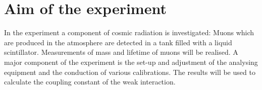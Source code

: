 \section{Aim of the experiment}

In the experiment a component of cosmic radiation is investigated:
Muons which are produced in the atmosphere are detected in a tank filled with a liquid scintillator.
Measurements of mass and lifetime of muons will be realised.
A major component of the experiment is the set-up and adjustment of the analysing equipment
and the conduction of various calibrations.
The results will be used to calculate the coupling constant of the weak interaction.
